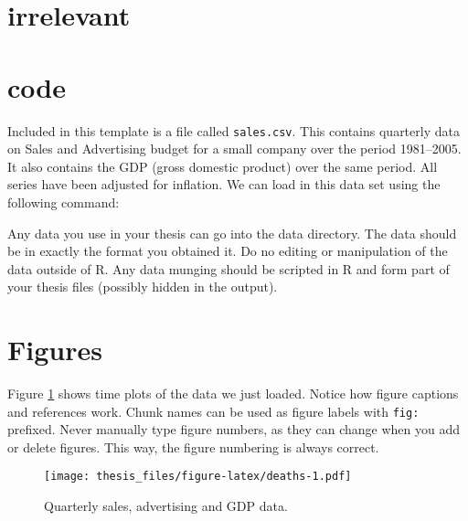 \documentclass{monashthesis}
\begin{document}
\newpage

\section{irrelevant}\label{irrelevant}

\section{code}\label{code}

Included in this template is a file called \texttt{sales.csv}. This
contains quarterly data on Sales and Advertising budget for a small
company over the period 1981--2005. It also contains the GDP (gross
domestic product) over the same period. All series have been adjusted
for inflation. We can load in this data set using the following command:

\begin{Shaded}
\begin{Highlighting}[]
\StringTok{ }\NormalTok{(}\NormalTok{(}\NormalTok{)[,}\OperatorTok{-}\NormalTok{], }\NormalTok{, }\NormalTok{)}
\end{Highlighting}
\end{Shaded}

Any data you use in your thesis can go into the data directory. The data
should be in exactly the format you obtained it. Do no editing or
manipulation of the data outside of R. Any data munging should be
scripted in R and form part of your thesis files (possibly hidden in the
output).

\section{Figures}\label{figures}

Figure \ref{fig:deaths} shows time plots of the data we just loaded.
Notice how figure captions and references work. Chunk names can be used
as figure labels with \texttt{fig:} prefixed. Never manually type figure
numbers, as they can change when you add or delete figures. This way,
the figure numbering is always correct.

\begin{figure}
\centering
\texttt{[image: thesis\_files/figure-latex/deaths-1.pdf]}
\caption{\label{fig:deaths}Quarterly sales, advertising and GDP data.}
\end{figure}
\end{document}
